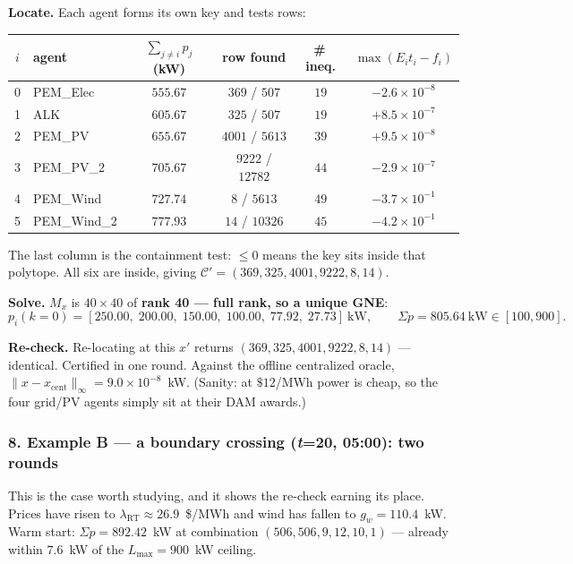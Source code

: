 \documentclass[11pt, letterpaper]{article}
\begin{document}
\textbf{Locate.} Each agent forms its own key and tests rows:
\begin{center}\small
\begin{tabular}{clcccc}
\toprule
$i$ & agent & $\sum_{j\ne i}p_j$ (kW) & row found & \#\,ineq. & $\max(E_it_i-f_i)$\\
\midrule
0 & PEM\_Elec   & $555.67$ & $369$ / $507$    & $19$ & $-2.6\times10^{-8}$\\
1 & ALK         & $605.67$ & $325$ / $507$    & $19$ & $+8.5\times10^{-7}$\\
2 & PEM\_PV     & $655.67$ & $4001$ / $5613$  & $39$ & $+9.5\times10^{-8}$\\
3 & PEM\_PV\_2  & $705.67$ & $9222$ / $12782$ & $44$ & $-2.9\times10^{-7}$\\
4 & PEM\_Wind   & $727.74$ & $8$ / $5613$     & $49$ & $-3.7\times10^{-1}$\\
5 & PEM\_Wind\_2& $777.93$ & $14$ / $10326$   & $45$ & $-4.2\times10^{-1}$\\
\bottomrule
\end{tabular}
\end{center}
The last column is the containment test: $\le0$ means the key sits inside that polytope. All six are
inside, giving $\mathcal C'=(369,325,4001,9222,8,14)$.

\textbf{Solve.} $M_x$ is $40\times40$ of \textbf{rank 40 --- full rank, so a unique GNE}:
\[
  p_i(k{=}0)=[250.00,\;200.00,\;150.00,\;100.00,\;77.92,\;27.73]\ \text{kW},\qquad
  \Sigma p=805.64\ \text{kW}\in[100,900].
\]

\textbf{Re-check.} Re-locating at this $x'$ returns $(369,325,4001,9222,8,14)$ --- identical.
Certified in one round. Against the offline centralized oracle,
$\lVert x-x_{\mathrm{cent}}\rVert_\infty=9.0\times10^{-8}$~kW. (Sanity: at $\$12$/MWh power is cheap,
so the four grid/PV agents simply sit at their DAM awards.)

\subsubsection*{8. Example B --- a boundary crossing (\textit{t}=20, 05:00): two rounds}
This is the case worth studying, and it shows the re-check earning its place. Prices have risen to
$\lambda_{\mathrm{RT}}\approx26.9$~\$/MWh and wind has fallen to $g_w=110.4$~kW. Warm start:
$\Sigma p=892.42$~kW at combination $(506,506,9,12,10,1)$ --- already within $7.6$~kW of the
$L_{\max}=900$~kW ceiling.
\end{document}
